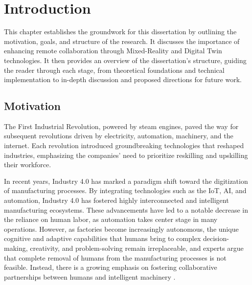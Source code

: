 \chapter{Introduction}%
\label{chapter:introduction}

\begin{introduction}
This chapter establishes the groundwork for this dissertation by outlining the motivation, goals, and structure of the research. It discusses the importance of enhancing remote collaboration through Mixed-Reality and Digital Twin technologies. It then provides an overview of the dissertation’s structure, guiding the reader through each stage, from theoretical foundations and technical implementation to in-depth discussion and proposed directions for future work.
\end{introduction}

\section{Motivation}
\label{section:Motivation}
% 
The First Industrial Revolution, powered by steam engines, paved the way for subsequent revolutions driven by electricity, automation, machinery, 
and the internet. Each revolution introduced groundbreaking technologies that reshaped industries, emphasizing the companies' need to prioritize reskilling 
and upskilling their workforce.

In recent years, Industry 4.0 has marked a paradigm shift toward the digitization of manufacturing processes. By integrating technologies such as the \ac{IoT}, \ac{AI}, and automation, Industry 4.0 has fostered highly interconnected and intelligent manufacturing ecosystems. These advancements have led to a notable decrease in the reliance on human labor, as automation takes center stage in many operations.
However, as factories become increasingly autonomous, the unique cognitive and adaptive capabilities that humans bring to complex decision-making, creativity, and problem-solving remain irreplaceable, and experts argue that complete removal of humans from the manufacturing processes is not feasible. Instead, there is a growing emphasis on fostering collaborative partnerships between humans and intelligent machinery \cite{Weiss2021}.

